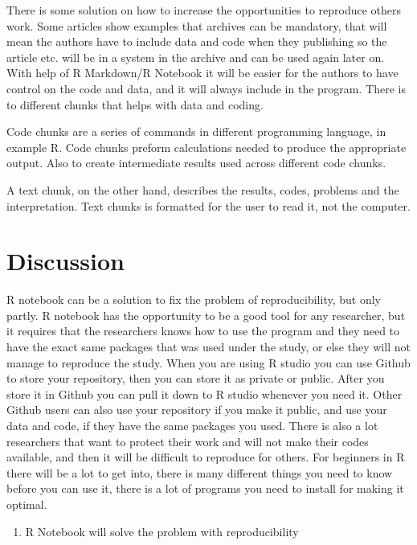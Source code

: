 \documentclass[
  12pt,
  norsk,
]{article}
\providecommand{\tightlist}{%
  \setlength{\itemsep}{0pt}\setlength{\parskip}{0pt}}
\begin{document}
There is some solution on how to increase the opportunities to reproduce
others work. Some articles show examples that archives can be mandatory,
that will mean the authors have to include data and code when they
publishing so the article etc. will be in a system in the archive and
can be used again later on. With help of R Markdown/R Notebook it will
be easier for the authors to have control on the code and data, and it
will always include in the program. There is to different chunks that
helps with data and coding.

Code chunks are a series of commands in different programming language,
in example R. Code chunks preform calculations needed to produce the
appropriate output. Also to create intermediate results used across
different code chunks.

A text chunk, on the other hand, describes the results, codes, problems
and the interpretation. Text chunks is formatted for the user to read
it, not the computer.

\hypertarget{discussion}{%
\section{Discussion}\label{discussion}}

R notebook can be a solution to fix the problem of reproducibility, but
only partly. R notebook has the opportunity to be a good tool for any
researcher, but it requires that the researchers knows how to use the
program and they need to have the exact same packages that was used
under the study, or else they will not manage to reproduce the study.
When you are using R studio you can use Github to store your repository,
then you can store it as private or public. After you store it in Github
you can pull it down to R studio whenever you need it. Other Github
users can also use your repository if you make it public, and use your
data and code, if they have the same packages you used. There is also a
lot researchers that want to protect their work and will not make their
codes available, and then it will be difficult to reproduce for others.
For beginners in R there will be a lot to get into, there is many
different things you need to know before you can use it, there is a lot
of programs you need to install for making it optimal.

\begin{enumerate}
\def\labelenumi{\arabic{enumi}.}
\tightlist
\item
  R Notebook will solve the problem with reproducibility
\end{enumerate}
\end{document}
